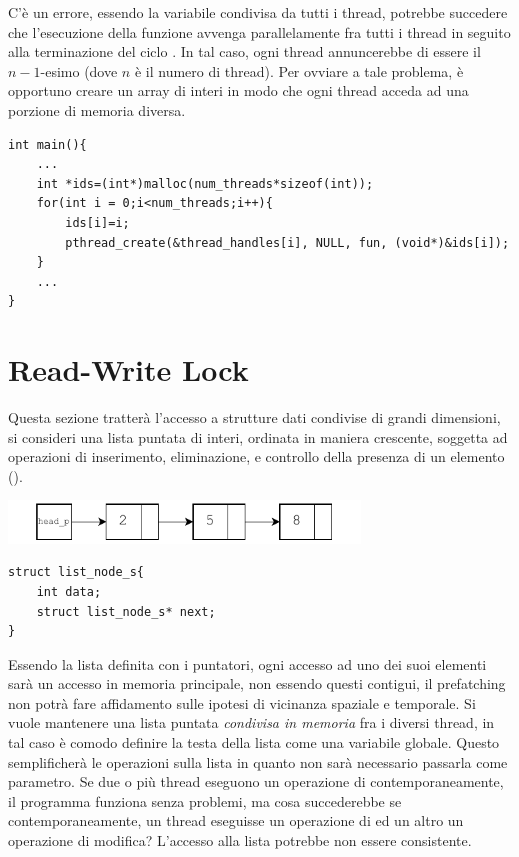 \documentclass[10pt, letterpaper]{report}
\begin{document}
C'è un errore, essendo la variabile  condivisa da tutti i thread, potrebbe succedere che l'esecuzione della funzione  avvenga parallelamente fra tutti i thread in seguito alla terminazione del ciclo . In tal caso, ogni thread annuncerebbe di essere il $n-1$-esimo (dove $n$ è il numero di thread). \acc 
Per ovviare a tale problema, è opportuno creare un array di interi in modo che ogni thread acceda ad una porzione di memoria diversa.
\begin{lstlisting}[style=CStyle]
int main(){
    ... 
    int *ids=(int*)malloc(num_threads*sizeof(int));
    for(int i = 0;i<num_threads;i++){
        ids[i]=i;
        pthread_create(&thread_handles[i], NULL, fun, (void*)&ids[i]);
    }
    ...
}
    \end{lstlisting}
    \flowerLine 
\section{Read-Write Lock}
Questa sezione tratterà l'accesso a strutture dati condivise di grandi dimensioni, si consideri una lista puntata di interi, ordinata in maniera crescente, soggetta ad operazioni di inserimento, eliminazione, e controllo della presenza di un elemento ().\begin{center}
    \includegraphics[width=0.7\textwidth]{images/lista.pdf}
\end{center}
\begin{lstlisting}[style=CStyle]
struct list_node_s{
    int data;
    struct list_node_s* next;
}
\end{lstlisting}
Essendo la lista definita con i puntatori, ogni accesso ad uno dei suoi elementi sarà un accesso in memoria principale, non essendo questi contigui, il prefatching non potrà fare affidamento sulle ipotesi di vicinanza spaziale e temporale.\acc 
Si vuole mantenere una lista puntata \textit{condivisa in memoria} fra i diversi thread, in tal caso è comodo definire la testa della lista  come una variabile globale. Questo semplificherà le operazioni sulla lista in quanto non sarà necessario passarla come parametro.\acc 
Se due o più thread eseguono un operazione di  contemporaneamente, il programma funziona senza problemi, ma cosa succederebbe se contemporaneamente, un thread eseguisse un operazione di   ed un altro un operazione di modifica? L'accesso alla lista potrebbe non essere consistente.
\end{document}
